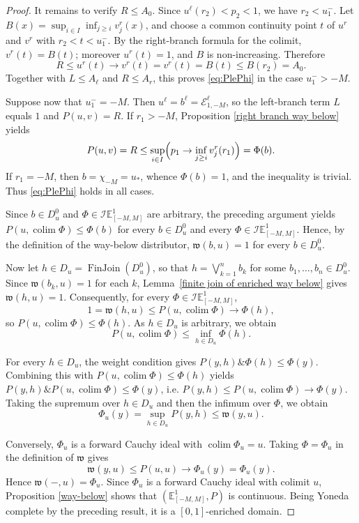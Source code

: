 \documentclass[preprint,3p,times]{elsarticle}
\theoremstyle{plain}
\theoremstyle{definition}
\numberwithin{equation}{section}
\begin{document}
\begin{proof}
It remains to verify \(R\le A_0\). Since \(u^\ell(r_2)<p_2<1\), we have
\(r_2<u_1^-\). Let \(B(x)=\sup_{i\in I}\inf_{j\ge i}v_j^r(x)\), and choose a
common continuity point \(t\) of \(u^r\) and \(v^r\) with \(r_2<t<u_1^-\).
By the right-branch formula for the colimit, \(v^r(t)=B(t)\); moreover
\(u^r(t)=1\), and \(B\) is non-increasing. Therefore
\[
R\le u^r(t)\to v^r(t)=v^r(t)=B(t)\le B(r_2)=A_0.
\]
Together with \(L\le A_\ell\) and \(R\le A_r\), this proves
\eqref{eq:PlePhi} in the case \(u_1^->-M\).

Suppose now that \(u_1^-=-M\). Then \(u^\ell=b^\ell=\mathcal E^\ell_{1,-M}\),
so the left-branch term \(L\) equals \(1\) and \(P(u,v)=R\). If \(r_1>-M\),
Proposition \ref{right branch way below} yields
\[
P(u,v)=R\le\sup_{i\in I}\Bigl(p_1\to\inf_{j\ge i}v_j^r(r_1)\Bigr)=\Phi(b).
\]
If \(r_1=-M\), then \(b=\chi_{-M}=u_*\), whence \(\Phi(b)=1\), and the
inequality is trivial. Thus \eqref{eq:PlePhi} holds in all cases.

\smallskip
Since \(b\in D_u^0\) and \(\Phi\in\mathcal I\mathbb E^1_{[-M,M]}\) are arbitrary, the preceding argument yields
\(P(u,\operatorname{colim}\Phi)\le\Phi(b)\) for every \(b\in D_u^0\) and every \(\Phi\in\mathcal I\mathbb E^1_{[-M,M]}\).
Hence, by the definition of the way-below distributor, \(\mathfrak w(b,u)=1\) for every \(b\in D_u^0\).

Now let \(h\in D_u=\operatorname{FinJoin}(D_u^0)\), so that \(h=\bigvee_{k=1}^n b_k\) for some \(b_1,\ldots,b_n\in D_u^0\).
Since \(\mathfrak w(b_k,u)=1\) for each \(k\), Lemma~\ref{finite join of enriched way below} gives \(\mathfrak w(h,u)=1\).
Consequently, for every \(\Phi\in\mathcal I\mathbb E^1_{[-M,M]}\),
\[
1=\mathfrak w(h,u)\le P(u,\operatorname{colim}\Phi)\to\Phi(h),
\]
so \(P(u,\operatorname{colim}\Phi)\le\Phi(h)\). As \(h\in D_u\) is arbitrary, we obtain
\[
P(u,\operatorname{colim}\Phi)\le\inf_{h\in D_u}\Phi(h).
\]


For every \(h\in D_u\), the weight condition gives
\(P(y,h)\mathbin{\&}\Phi(h)\le\Phi(y)\). Combining this with
\(P(u,\operatorname{colim}\Phi)\le\Phi(h)\) yields
\(P(y,h)\mathbin{\&}P(u,\operatorname{colim}\Phi)\le\Phi(y)\), i.e.
\(P(y,h)\le P(u,\operatorname{colim}\Phi)\to\Phi(y)\). Taking the supremum
over \(h\in D_u\) and then the infimum over \(\Phi\), we obtain
\[
\Phi_u(y)=\sup_{h\in D_u}P(y,h)\le\mathfrak w(y,u).
\]

Conversely, \(\Phi_u\) is a forward Cauchy ideal with
\(\operatorname{colim}\Phi_u=u\). Taking \(\Phi=\Phi_u\) in the definition
of \(\mathfrak w\) gives
\[
\mathfrak w(y,u)\le P(u,u)\to\Phi_u(y)=\Phi_u(y).
\]
Hence \(\mathfrak w(-,u)=\Phi_u\). Since \(\Phi_u\) is a forward Cauchy
ideal with colimit \(u\), Proposition \ref{way-below} shows that
\((\mathbb E^1_{[-M,M]},P)\) is continuous. Being Yoneda complete by the
preceding result, it is a \([0,1]\)-enriched domain.
\end{proof}
\end{document}
